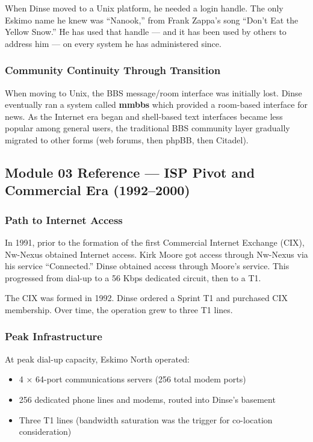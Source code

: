 \documentclass[11pt,letterpaper]{article}
\begin{document}
When Dinse moved to a Unix platform, he needed a login handle. The only Eskimo name he knew was ``Nanook,'' from Frank Zappa's song ``Don't Eat the Yellow Snow.'' He has used that handle --- and it has been used by others to address him --- on every system he has administered since.

\subsubsection{Community Continuity Through Transition}

When moving to Unix, the BBS message/room interface was initially lost. Dinse eventually ran a system called \textbf{mmbbs} which provided a room-based interface for news. As the Internet era began and shell-based text interfaces became less popular among general users, the traditional BBS community layer gradually migrated to other forms (web forums, then phpBB, then Citadel).

\subsection{Module 03 Reference --- ISP Pivot and Commercial Era (1992--2000)}

\subsubsection{Path to Internet Access}

In 1991, prior to the formation of the first Commercial Internet Exchange (CIX), Nw-Nexus obtained Internet access. Kirk Moore got access through Nw-Nexus via his service ``Connected.'' Dinse obtained access through Moore's service. This progressed from dial-up to a 56 Kbps dedicated circuit, then to a T1.

The CIX was formed in 1992. Dinse ordered a Sprint T1 and purchased CIX membership. Over time, the operation grew to three T1 lines.

\subsubsection{Peak Infrastructure}

At peak dial-up capacity, Eskimo North operated:
\begin{itemize}[leftmargin=1.5em]
  \item 4 × 64-port communications servers (256 total modem ports)
  \item 256 dedicated phone lines and modems, routed into Dinse's basement
  \item Three T1 lines (bandwidth saturation was the trigger for co-location consideration)
\end{itemize}
\end{document}
